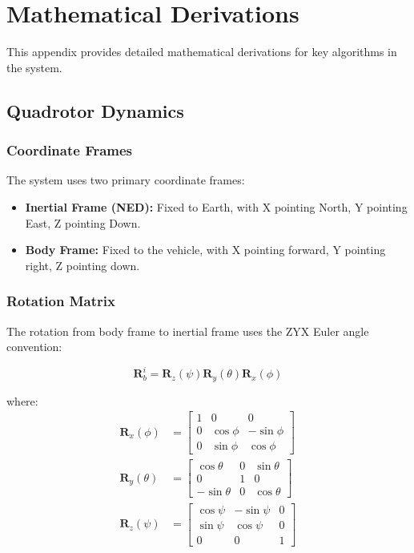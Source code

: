 
\chapter{Mathematical Derivations}
\label{app:math}

This appendix provides detailed mathematical derivations for key algorithms in the system.

\section{Quadrotor Dynamics}

\subsection{Coordinate Frames}

The system uses two primary coordinate frames:
\begin{itemize}
    \item \textbf{Inertial Frame (NED):} Fixed to Earth, with X pointing North, Y pointing East, Z pointing Down.
    \item \textbf{Body Frame:} Fixed to the vehicle, with X pointing forward, Y pointing right, Z pointing down.
\end{itemize}

\subsection{Rotation Matrix}

The rotation from body frame to inertial frame uses the ZYX Euler angle convention:

\begin{equation}
    \mathbf{R}_{b}^{i} = \mathbf{R}_z(\psi) \mathbf{R}_y(\theta) \mathbf{R}_x(\phi)
\end{equation}

where:
\begin{align}
    \mathbf{R}_x(\phi) &= \begin{bmatrix}
        1 & 0 & 0 \\
        0 & \cos\phi & -\sin\phi \\
        0 & \sin\phi & \cos\phi
    \end{bmatrix} \\[10pt]
    \mathbf{R}_y(\theta) &= \begin{bmatrix}
        \cos\theta & 0 & \sin\theta \\
        0 & 1 & 0 \\
        -\sin\theta & 0 & \cos\theta
    \end{bmatrix} \\[10pt]
    \mathbf{R}_z(\psi) &= \begin{bmatrix}
        \cos\psi & -\sin\psi & 0 \\
        \sin\psi & \cos\psi & 0 \\
        0 & 0 & 1
    \end{bmatrix}
\end{align}

